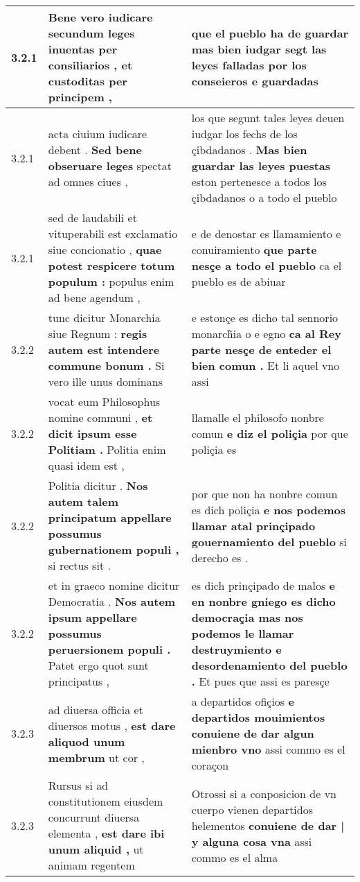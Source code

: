 \begin{tabular}{|p{1cm}|p{6.5cm}|p{6.5cm}|}
3.2.1 & Bene vero iudicare \textbf{ secundum leges inuentas per consiliarios , } et custoditas per principem , & que el pueblo ha de guardar \textbf{ mas bien iudgar segt las leyes falladas } por los conseieros e guardadas \\\hline
3.2.1 & acta ciuium iudicare debent . \textbf{ Sed bene obseruare leges } spectat ad omnes ciues , & los que segunt tales leyes deuen iudgar los fechs de los çibdadanos . \textbf{ Mas bien guardar las leyes puestas } eston pertenesce a todos los çibdadanos o a todo el pueblo \\\hline
3.2.1 & sed de laudabili et vituperabili est exclamatio siue concionatio , \textbf{ quae potest respicere totum populum : } populus enim ad bene agendum , & e de denostar es llamamiento e conuiramiento \textbf{ que parte nesçe a todo el pueblo } ca el pueblo es de abiuar \\\hline
3.2.2 & tunc dicitur Monarchia siue Regnum : \textbf{ regis autem est intendere commune bonum . } Si vero ille unus dominans & e estonçe es dicho tal sennorio monarch̃ia o e egno \textbf{ ca al Rey parte nesçe de enteder el bien comun . } Et li aquel vno assi \\\hline
3.2.2 & vocat eum Philosophus nomine communi , \textbf{ et dicit ipsum esse Politiam . } Politia enim quasi idem est , & llamalle el philosofo nonbre comun \textbf{ e diz el poliçia } por que poliçia es \\\hline
3.2.2 & Politia dicitur . \textbf{ Nos autem talem principatum appellare possumus gubernationem populi , } si rectus sit . & por que non ha nonbre comun es dich poliçia \textbf{ e nos podemos llamar atal prinçipado gouernamiento del pueblo } si derecho es . \\\hline
3.2.2 & et in graeco nomine dicitur Democratia . \textbf{ Nos autem ipsum appellare possumus peruersionem populi . } Patet ergo quot sunt principatus , & es dich prinçipado de malos \textbf{ e en nonbre gniego es dicho democraçia mas nos podemos le llamar destruymiento e desordenamiento del pueblo . } Et pues que assi es paresçe \\\hline
3.2.3 & ad diuersa officia et diuersos motus , \textbf{ est dare aliquod unum membrum } ut cor , & a departidos ofiçios \textbf{ e departidos mouimientos conuiene de dar algun mienbro vno } assi commo es el coraçon \\\hline
3.2.3 & Rursus si ad constitutionem eiusdem concurrunt diuersa elementa , \textbf{ est dare ibi unum aliquid , } ut animam regentem & Otrossi si a conposicion de vn cuerpo vienen departidos helementos \textbf{ conuiene de dar | y alguna cosa vna } assi commo es el alma \\\hline

\end{tabular}
